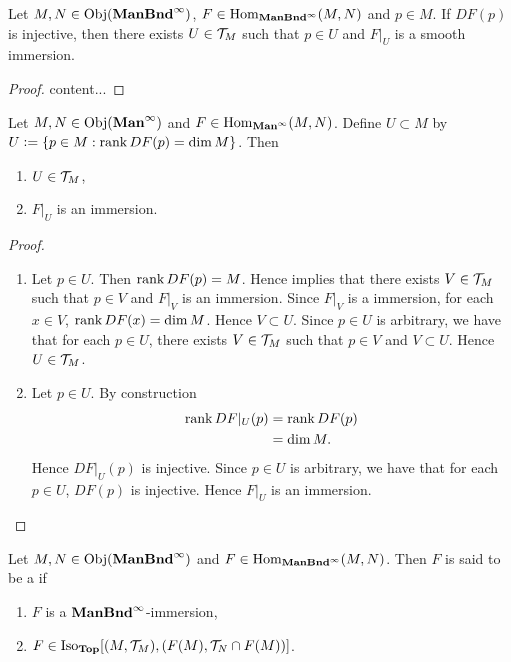\documentclass{book}
\begin{document}
	\begin{ex} 
		Let $M, N \in \operatorname{Obj}(\operatorname*{\text{\textbf{ManBnd}}^{\infty}})$, $F \in \operatorname{Hom}_{\operatorname*{\text{\textbf{ManBnd}}^{\infty}}}(M, N)$ and $p \in M$. If $DF(p)$ is injective, then there exists $U \in \mathcal{T}_M$ such that $p \in U$ and $F|_U$ is a smooth immersion.
	\end{ex}

	\begin{proof}
		content...
	\end{proof}

	\begin{ex} 
		Let $M, N \in \operatorname{Obj}(\operatorname*{\text{\textbf{Man}}^{\infty}})$ and $F \in \operatorname{Hom}_{\operatorname*{\text{\textbf{Man}}^{\infty}}}(M,N)$. Define $U \subset M$ by $U \vcentcolon= \{p \in M: \operatorname{\text{rank}} DF(p) = \dim M\}$. Then 
		\begin{enumerate}
			\item $U \in \mathcal{T}_M$,
			\item $F|_U$ is an immersion.
		\end{enumerate}
	\end{ex}
	
	\begin{proof}\
		\begin{enumerate}
			\item Let $p \in U$. Then $\operatorname{\text{rank}} DF(p) = M$. Hence  implies that there exists $V \in \mathcal{T}_M$ such that $p \in V$ and $F|_V$ is an immersion. Since $F|_V$ is a immersion, for each $x \in V$, $\operatorname{\text{rank}} DF(x) = \dim M$. Hence $V \subset U$. Since $p \in U$ is arbitrary, we have that for each $p \in U$, there exists $V \in \mathcal{T}_M$ such that $p \in V$ and $V \subset U$. Hence $U \in \mathcal{T}_M$.
			\item Let $p \in U$. By construction  
			\begin{align*}
				\operatorname{\text{rank}} DF|_U(p)
				& = \operatorname{\text{rank}} DF(p) \\ 
				& = \dim M.
			\end{align*}
			Hence $DF|_U(p)$ is injective. Since $p \in U$ is arbitrary, we have that for each $p \in U$, $DF(p)$ is injective. Hence $F|_U$ is an immersion.
		\end{enumerate}
	\end{proof}
	
	\begin{defn}  
		Let $M, N \in \operatorname{Obj}(\operatorname*{\text{\textbf{ManBnd}}^{\infty}})$ and $F \in \operatorname{Hom}_{\operatorname*{\text{\textbf{ManBnd}}^{\infty}}}(M, N)$. Then $F$ is said to be a  if 
		\begin{enumerate}
			\item $F$ is a $\operatorname*{\text{\textbf{ManBnd}}^{\infty}}$-immersion, 
			\item $F \in \operatorname{Iso}_{\operatorname*{\text{\textbf{Top}}}}[(M, \mathcal{T}_M), (F(M), \mathcal{T}_N \cap F(M))]$.
		\end{enumerate}	 
	\end{defn}	
\end{document}
